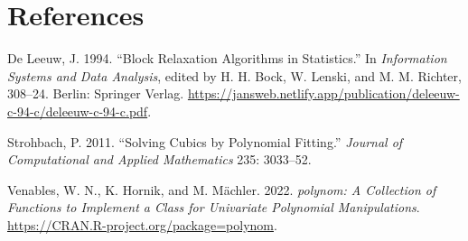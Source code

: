 \documentclass[
  12pt,
]{article}
\newenvironment{Shaded}{\begin{snugshade}}{\end{snugshade}}
\newcommand{\AttributeTok}[1]{\textcolor[rgb]{0.13,0.29,0.53}{#1}}
\newcommand{\DecValTok}[1]{\textcolor[rgb]{0.00,0.00,0.81}{#1}}
\newcommand{\FunctionTok}[1]{\textcolor[rgb]{0.13,0.29,0.53}{\textbf{#1}}}
\newcommand{\NormalTok}[1]{#1}
\newcommand{\OtherTok}[1]{\textcolor[rgb]{0.56,0.35,0.01}{#1}}
\newcommand{\SpecialCharTok}[1]{\textcolor[rgb]{0.81,0.36,0.00}{\textbf{#1}}}
\newlength{\cslhangindent}
\newenvironment{CSLReferences}[2] %
 {\begin{list}{}{%
  \setlength{\itemindent}{0pt}
  \setlength{\leftmargin}{0pt}
  \setlength{\parsep}{0pt}
  \ifodd #1
   \setlength{\leftmargin}{\cslhangindent}
   \setlength{\itemindent}{-1\cslhangindent}
  \fi
  \setlength{\itemsep}{#2\baselineskip}}}
 {\end{list}}
\begin{document}
\begin{Shaded}
\end{Shaded}

\normalsize

\section*{References}\label{references}

\label{refs}
\begin{CSLReferences}{1}{0}
De Leeuw, J. 1994. {``{Block Relaxation Algorithms in Statistics}.''} In \emph{Information Systems and Data Analysis}, edited by H. H. Bock, W. Lenski, and M. M. Richter, 308--24. Berlin: Springer Verlag. \url{https://jansweb.netlify.app/publication/deleeuw-c-94-c/deleeuw-c-94-c.pdf}.

Strohbach, P. 2011. {``Solving Cubics by Polynomial Fitting.''} \emph{Journal of Computational and Applied Mathematics} 235: 3033--52.

Venables, W. N., K. Hornik, and M. Mächler. 2022. \emph{{polynom: A Collection of Functions to Implement a Class for Univariate Polynomial Manipulations}}. \url{https://CRAN.R-project.org/package=polynom}.

\end{CSLReferences}
\end{document}
